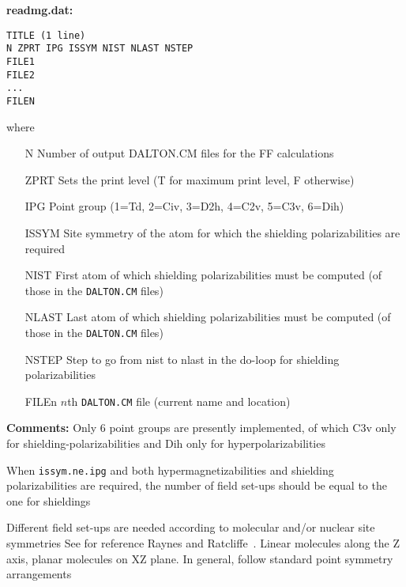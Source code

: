 \smallskip
\noindent
{\bf readmg.dat:} 

\begin{verbatim}
TITLE (1 line)
N ZPRT IPG ISSYM NIST NLAST NSTEP
FILE1
FILE2
... 
FILEN 
\end{verbatim}
where
\begin{itemize}
\item[N] Number of output DALTON.CM files for the FF calculations
\item[ZPRT]  Sets the print level (T for maximum print level, F otherwise)
\item[IPG] Point group (1=Td, 2=Civ, 3=D2h, 4=C2v, 5=C3v, 6=Dih)
\item[ISSYM] Site symmetry of the atom for which the shielding
               polarizabilities are required
\item[NIST] First atom of which shielding polarizabilities must be computed
               (of those in  the \verb|DALTON.CM| files)
\item[NLAST] Last atom of which shielding polarizabilities must be computed
               (of those in  the \verb|DALTON.CM| files)
\item[NSTEP] Step to go from nist to nlast in the do-loop for
               shielding polarizabilities
\item[FILEn] $n$th \verb|DALTON.CM| file (current name and location)
\end{itemize}

\smallskip
\noindent
{\bf Comments:} 
    Only 6 point groups are presently implemented, of which
    C3v only for shielding-polarizabilities and 
    Dih only for hyperpolarizabilities 

    When \verb|issym.ne.ipg| and both
    hypermagnetizabilities
    and shielding 
    polarizabilities are required, the number of field set-ups should 
    be equal to the one for shieldings

    Different field set-ups are needed according to
    molecular  and/or nuclear site symmetries
    See for reference Raynes and Ratcliffe~\cite{wtrrrmp37}.
    Linear molecules along the Z axis, planar molecules
    on XZ plane. In general, follow standard point
    symmetry arrangements

